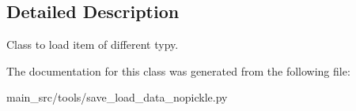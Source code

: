 \subsection{Detailed Description}
Class to load item of different typy. 

The documentation for this class was generated from the following file\-:\begin{DoxyCompactItemize}
\item 
main\-\_\-src/tools/save\-\_\-load\-\_\-data\-\_\-nopickle.\-py\end{DoxyCompactItemize}
